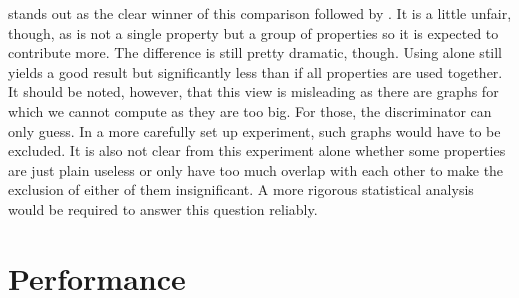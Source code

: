 \documentclass{graphstudy}
\begin{document}
 stands out as the clear winner of this comparison followed by .  It is a little
unfair, though, as  is not a single property but a group of properties so it is expected to contribute
more.  The difference is still pretty dramatic, though.  Using  alone still yields a good result but
significantly less than if all properties are used together.  It should be noted, however, that this view is misleading
as there are graphs for which we cannot compute  as they are too big.  For those, the discriminator can
only guess.  In a more carefully set up experiment, such graphs would have to be excluded.  It is also not clear from
this experiment alone whether some properties are just plain useless or only have too much overlap with each other to
make the exclusion of either of them insignificant.  A more rigorous statistical analysis would be required to answer
this question reliably.

\begin{Table}
  \begin{center}
  \end{center}
  \caption[Cross Validation With Reduced Feature Vector]{%
    Cross validation results (success rates) with one property deliberately excluded (middle column) and only a single
    property included (right column) respectively.  Rows are sorted by the middle column.  It is immediately visible
    that  has by far the biggest contribution followed by  (which doesn't add much
    when used \emph{together} with  for apparent reasons but is almost as effective when used alone).
     and  seem to contribute something while the ,  and
     appear close to useless.  It could be that there is much overlap between the properties except
    \acs{rdf} such that omitting any of them alone has little effect.  The low contribution of  is not
    very surprising.  Please see the text for additional remarks.  It should be noted that we used only \(5\) cross
    validation runs to obtain the entries in this table.
  }
  \label{tab:without}
\end{Table}

\section{Performance}
\end{document}
